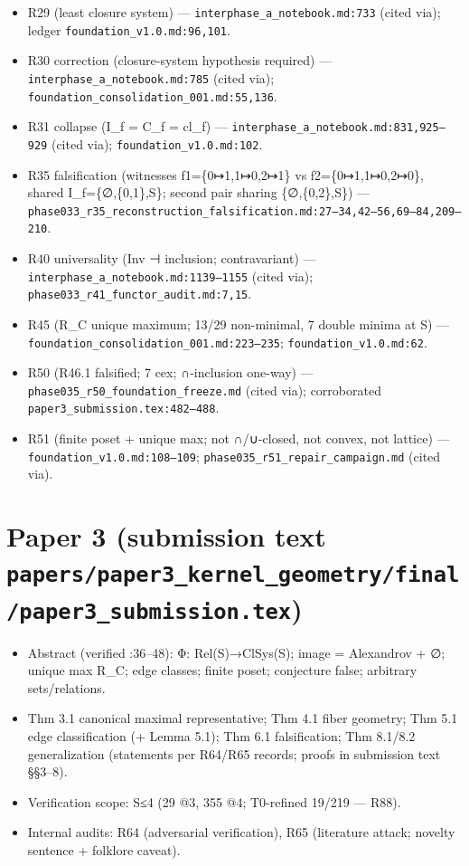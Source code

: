 \documentclass[
  11pt,
]{book}
\providecommand{\tightlist}{%
  \setlength{\itemsep}{0pt}\setlength{\parskip}{0pt}}
\begin{document}
\begin{itemize}
\tightlist
\item
  R29 (least closure system) --- \texttt{interphase\_a\_notebook.md:733}
  (cited via); ledger \texttt{foundation\_v1.0.md:96,101}.
\item
  R30 correction (closure-system hypothesis required) ---
  \texttt{interphase\_a\_notebook.md:785} (cited via);
  \texttt{foundation\_consolidation\_001.md:55,136}.
\item
  R31 collapse (I\_f = C\_f = cl\_f) ---
  \texttt{interphase\_a\_notebook.md:831,925–929} (cited via);
  \texttt{foundation\_v1.0.md:102}.
\item
  R35 falsification (witnesses f1=\{0↦1,1↦0,2↦1\} vs f2=\{0↦1,1↦0,2↦0\},
  shared I\_f=\{∅,\{0,1\},S\}; second pair sharing \{∅,\{0,2\},S\}) ---
  \texttt{phase033\_r35\_reconstruction\_falsification.md:27–34,42–56,69–84,209–210}.
\item
  R40 universality (Inv ⊣ inclusion; contravariant) ---
  \texttt{interphase\_a\_notebook.md:1139–1155} (cited via);
  \texttt{phase033\_r41\_functor\_audit.md:7,15}.
\item
  R45 (R\_C unique maximum; 13/29 non-minimal, 7 double minima at
  \textbar S) ---
  \texttt{foundation\_consolidation\_001.md:223–235};
  \texttt{foundation\_v1.0.md:62}.
\item
  R50 (R46.1 falsified; 7 cex; ∩-inclusion one-way) ---
  \texttt{phase035\_r50\_foundation\_freeze.md} (cited via);
  corroborated \texttt{paper3\_submission.tex:482–488}.
\item
  R51 (finite poset + unique max; not ∩/∪-closed, not convex, not
  lattice) --- \texttt{foundation\_v1.0.md:108–109};
  \texttt{phase035\_r51\_repair\_campaign.md} (cited via).
\end{itemize}

\section{\texorpdfstring{Paper 3 (submission text
\texttt{papers/paper3\_kernel\_geometry/final/paper3\_submission.tex})}{Paper 3 (submission text papers/paper3\_kernel\_geometry/final/paper3\_submission.tex)}}\label{paper-3-submission-text-paperspaper3_kernel_geometryfinalpaper3_submission.tex}

\begin{itemize}
\tightlist
\item
  Abstract (verified :36--48): Φ: Rel(S)→ClSys(S); image = Alexandrov +
  ∅; unique max R\_C; edge classes; finite poset; conjecture false;
  arbitrary sets/relations.
\item
  Thm 3.1 canonical maximal representative; Thm 4.1 fiber geometry; Thm
  5.1 edge classification (+ Lemma 5.1); Thm 6.1 falsification; Thm
  8.1/8.2 generalization (statements per R64/R65 records; proofs in
  submission text §§3--8).
\item
  Verification scope: \textbar S\textbar≤4 (29 @3, 355 @4; T0-refined
  19/219 --- R88).
\item
  Internal audits: R64 (adversarial verification), R65 (literature
  attack; novelty sentence + folklore caveat).
\end{itemize}
\end{document}
